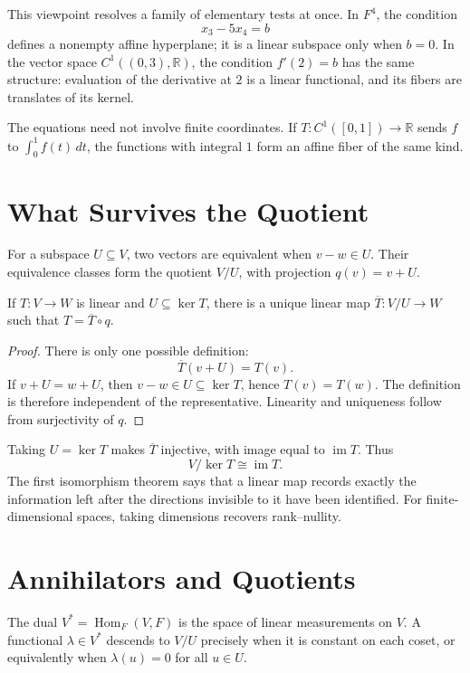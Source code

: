 This viewpoint resolves a family of elementary tests at once. In \(F^4\), the condition
\[
 x_3-5x_4=b
\]
defines a nonempty affine hyperplane; it is a linear subspace only when \(b=0\). In the vector space \(C^1((0,3),\mathbb R)\), the condition \(f'(2)=b\) has the same structure: evaluation of the derivative at \(2\) is a linear functional, and its fibers are translates of its kernel.

The equations need not involve finite coordinates. If \(T:C^1([0,1])\to\mathbb R\) sends \(f\) to \(\int_0^1f(t)\,dt\), the functions with integral \(1\) form an affine fiber of the same kind.

\section{What Survives the Quotient}

For a subspace \(U\subseteq V\), two vectors are equivalent when \(v-w\in U\). Their equivalence classes form the quotient \(V/U\), with projection \(q(v)=v+U\).

\begin{proposition}
If \(T:V\to W\) is linear and \(U\subseteq\ker T\), there is a unique linear map \(\overline T:V/U\to W\) such that \(T=\overline T\circ q\).
\end{proposition}
\begin{proof}
There is only one possible definition:
\[
 \overline T(v+U)=T(v).
\]
If \(v+U=w+U\), then \(v-w\in U\subseteq\ker T\), hence \(T(v)=T(w)\). The definition is therefore independent of the representative. Linearity and uniqueness follow from surjectivity of \(q\).
\end{proof}

Taking \(U=\ker T\) makes \(\overline T\) injective, with image equal to \(\operatorname{im}T\). Thus
\[
 \boxed{V/\ker T\cong\operatorname{im}T.}
\]
The first isomorphism theorem says that a linear map records exactly the information left after the directions invisible to it have been identified. For finite-dimensional spaces, taking dimensions recovers rank--nullity.

\section{Annihilators and Quotients}

The dual \(V^*=\operatorname{Hom}_F(V,F)\) is the space of linear measurements on \(V\). A functional \(\lambda\in V^*\) descends to \(V/U\) precisely when it is constant on each coset, or equivalently when \(\lambda(u)=0\) for all \(u\in U\).

